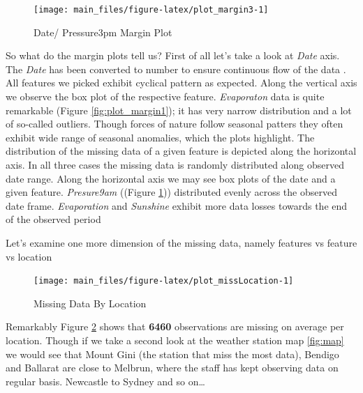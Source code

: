 \begin{Schunk}
\begin{figure}[H]

{\centering \texttt{[image: main\_files/figure-latex/plot\_margin3-1]} 

}

\caption[Date/ Pressure3pm Margin Plot]{Date/ Pressure3pm Margin Plot}\label{fig:plot_margin3}
\end{figure}
\end{Schunk}

So what do the margin plots tell us? First of all let's take a look at
\emph{Date} axis. The \emph{Date} has been converted to number to ensure
continuous flow of the data . All features we picked exhibit cyclical
pattern as expected. Along the vertical axis we observe the box plot of
the respective feature. \emph{Evaporaton} data is quite remarkable
(Figure \ref{fig:plot_margin1}); it has very narrow distribution and a
lot of so-called outliers. Though forces of nature follow seasonal
patters they often exhibit wide range of seasonal anomalies, which the
plots highlight. The distribution of the missing data of a given feature
is depicted along the horizontal axis. In all three cases the missing
data is randomly distributed along observed date range. Along the
horizontal axis we may see box plots of the date and a given feature.
\emph{Presure9am} ((Figure \ref{fig:plot_margin3})) distributed evenly
across the observed date frame. \emph{Evaporation} and \emph{Sunshine}
exhibit more data losses towards the end of the observed period

Let's examine one more dimension of the missing data, namely features vs
feature vs location

\begin{Schunk}
\begin{figure}[H]

{\centering \texttt{[image: main\_files/figure-latex/plot\_missLocation-1]} 

}

\caption[Missing Data By Location]{Missing Data By Location}\label{fig:plot_missLocation}
\end{figure}
\end{Schunk}

Remarkably Figure \ref{fig:plot_missLocation} shows that \textbf{6460}
observations are missing on average per location. Though if we take a
second look at the weather station map \ref{fig:map} we would see that
Mount Gini (the station that miss the most data), Bendigo and Ballarat
are close to Melbrun, where the staff has kept observing data on regular
basis. Newcastle to Sydney and so on\ldots{}

